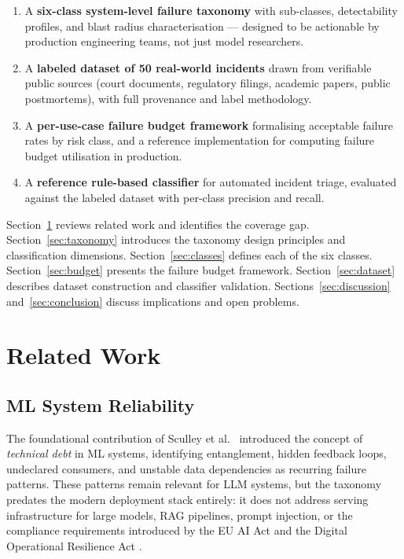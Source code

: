 \documentclass{article}
\begin{document}
\begin{enumerate}
  \item A \textbf{six-class system-level failure taxonomy} with sub-classes,
        detectability profiles, and blast radius characterisation --- designed
        to be actionable by production engineering teams, not just model
        researchers.

  \item A \textbf{labeled dataset of 50 real-world incidents} drawn from
        verifiable public sources (court documents, regulatory filings, academic
        papers, public postmortems), with full provenance and label methodology.

  \item A \textbf{per-use-case failure budget framework} formalising acceptable
        failure rates by risk class, and a reference implementation for
        computing failure budget utilisation in production.

  \item A \textbf{reference rule-based classifier} for automated incident triage,
        evaluated against the labeled dataset with per-class precision and recall.
\end{enumerate}

Section~\ref{sec:related} reviews related work and identifies the coverage gap.
Section~\ref{sec:taxonomy} introduces the taxonomy design principles and
classification dimensions.  Section~\ref{sec:classes} defines each of the six
classes.  Section~\ref{sec:budget} presents the failure budget framework.
Section~\ref{sec:dataset} describes dataset construction and classifier
validation.  Sections~\ref{sec:discussion} and~\ref{sec:conclusion} discuss
implications and open problems.

\section{Related Work}
\label{sec:related}

\subsection{ML System Reliability}

The foundational contribution of Sculley et al.\ \citep{sculley2015debt}
introduced the concept of \emph{technical debt} in ML systems, identifying
entanglement, hidden feedback loops, undeclared consumers, and unstable data
dependencies as recurring failure patterns.  These patterns remain relevant for
LLM systems, but the taxonomy predates the modern deployment stack entirely:
it does not address serving infrastructure for large models, RAG pipelines,
prompt injection, or the compliance requirements introduced by the EU AI Act
\citep{euaiact2024} and the Digital Operational Resilience Act
\citep{dora2022}.
\end{document}
